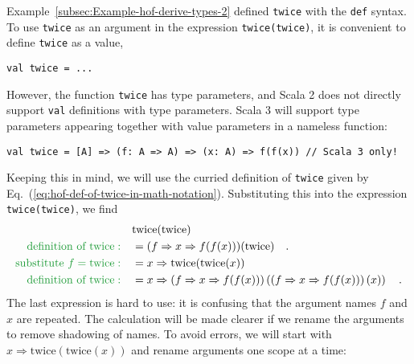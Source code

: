 Example~\ref{subsec:Example-hof-derive-types-2} defined \lstinline!twice!
with the \lstinline!def!
syntax. To use \lstinline!twice!
as an argument in the expression \lstinline!twice(twice)!,
it is convenient to define \lstinline!twice!
as a value,
\begin{lstlisting}
val twice = ...
\end{lstlisting}
However, the function \lstinline!twice!
has type parameters, and Scala 2 does not directly support \lstinline!val!
definitions with type parameters. Scala 3 will support type parameters
appearing together with value parameters in a nameless function:
\begin{lstlisting}
val twice = [A] => (f: A => A) => (x: A) => f(f(x)) // Scala 3 only!
\end{lstlisting}
Keeping this in mind, we will use the curried definition of \lstinline!twice!
given by Eq.~(\ref{eq:hof-def-of-twice-in-math-notation}). Substituting
this into the expression \lstinline!twice(twice)!,
we find
\begin{align*}
 & \text{twice}(\text{twice})\\
{\color{greenunder}\text{definition of twice}:}\quad & =(f\Rightarrow x\Rightarrow f(f(x)))(\text{twice})\quad.\\
{\color{greenunder}\text{substitute }f=\text{twice}:}\quad & =x\Rightarrow\text{twice}(\text{twice}(x))\\
{\color{greenunder}\text{definition of twice}:}\quad & =x\Rightarrow\left(f\Rightarrow x\Rightarrow f(f(x))\right)\left(\left(f\Rightarrow x\Rightarrow f(f(x))\right)(x)\right)\quad.
\end{align*}
The last expression is hard to use: it is confusing that the argument
names $f$ and $x$ are repeated. The calculation will be made clearer
if we rename the arguments to remove shadowing of names.
To avoid errors, we will start with $x\Rightarrow\text{twice}(\text{twice}(x))$
and rename arguments one scope at a time:
